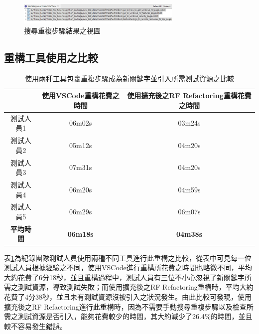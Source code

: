 \begin{figure}[H]
    \centering
    \includegraphics[width=0.7\textwidth]{picture/ch5/Eclipse_choose_duplicate_steps_in_case1.png}
    \caption{搜尋重複步驟結果之視圖}
    \label{f5.6}
\end{figure}


\subsection{重構工具使用之比較}

\begin{table}[H]
    \begin{center}
    \caption{使用兩種工具包裹重複步驟成為新關鍵字並引入所需測試資源之比較}\label{t5.1}
        \begin{tabular}{|c|c|c|}\hline
                             & 使用VSCode重構花費之時間    & 使用擴充後之RF Refactoring重構花費之時間    \\\hline
        測試人員1           & 06m02s          & 03m24s    \\\hline
        測試人員2           & 05m12s          & 04m20s    \\\hline
        測試人員3           & 07m31s          & 04m20s    \\\hline
        測試人員4           & 06m20s          & 04m59s    \\\hline
        測試人員5           & 06m29s          & 06m07s    \\\hline
\textbf{平均時間}           & \textbf{06m18s} & \textbf{04m38s}    \\\hline
        \end{tabular}
    \end{center}
\end{table}
\indent
表\ref{t5.1}為紀錄團隊測試人員使用兩種不同工具進行此重構之比較，從表中可見每一位測試人員根據經驗之不同，使用VSCode進行重構所花費之時間也略微不同，平均大約花費了6分18秒，並且重構過程中，測試人員有三位不小心忽視了新關鍵字所需之測試資源，導致測試失敗；而使用擴充後之RF Refactoring重構時，平均大約花費了4分38秒，並且未有測試資源沒被引入之狀況發生。由此比較可發現，使用擴充後之RF Refactoring進行此重構時，因為不需要手動搜尋重複步驟以及檢查所需之測試資源是否引入，能夠花費較少的時間，其大約減少了26.4\%的時間，並且較不容易發生錯誤。

